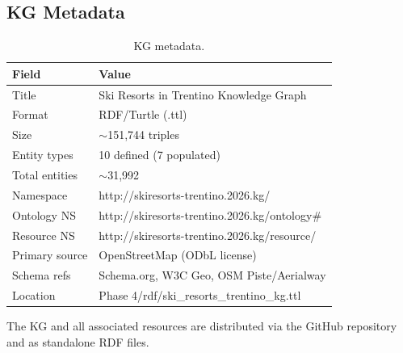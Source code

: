 \subsection{KG Metadata}

\begin{table}[h!]
\centering
\begin{tabular}{|l|p{8cm}|}
\hline
\textbf{Field} & \textbf{Value} \\
\hline
Title & Ski Resorts in Trentino Knowledge Graph \\
Format & RDF/Turtle (.ttl) \\
Size & $\sim$151,744 triples \\
Entity types & 10 defined (7 populated) \\
Total entities & $\sim$31,992 \\
Namespace & http://skiresorts-trentino.2026.kg/ \\
Ontology NS & http://skiresorts-trentino.2026.kg/ontology\# \\
Resource NS & http://skiresorts-trentino.2026.kg/resource/ \\
Primary source & OpenStreetMap (ODbL license) \\
Schema refs & Schema.org, W3C Geo, OSM Piste/Aerialway \\
Location & Phase 4/rdf/ski\_resorts\_trentino\_kg.ttl \\
\hline
\end{tabular}
\caption{KG metadata.}
\end{table}

\noindent The KG and all associated resources are distributed via the GitHub repository and as standalone RDF files.
